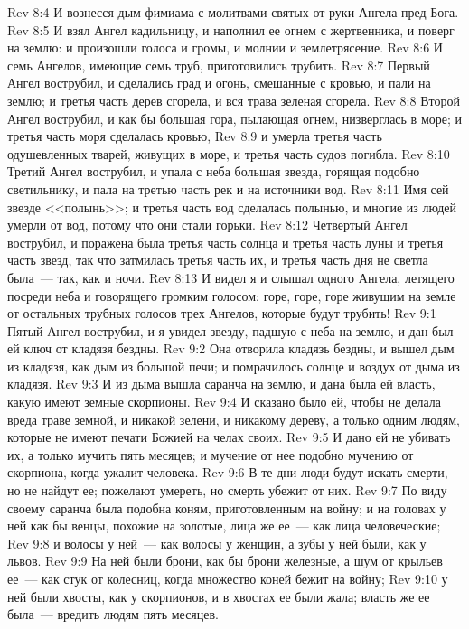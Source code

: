 \vs Rev 8:4 И вознесся дым фимиама с молитвами святых от руки Ангела пред Бога.
\vs Rev 8:5 И взял Ангел кадильницу, и наполнил ее огнем с жертвенника, и поверг на землю: и произошли голоса и громы, и молнии и землетрясение.
\rsbpar\vs Rev 8:6 И семь Ангелов, имеющие семь труб, приготовились трубить.
\rsbpar\vs Rev 8:7 Первый Ангел вострубил, и сделались град и огонь, смешанные с кровью, и пали на землю; и третья часть дерев сгорела, и вся трава зеленая сгорела.
\rsbpar\vs Rev 8:8 Второй Ангел вострубил, и как бы большая гора, пылающая огнем, низверглась в море; и третья часть моря сделалась кровью,
\vs Rev 8:9 и умерла третья часть одушевленных тварей, живущих в море, и третья часть судов погибла.
\rsbpar\vs Rev 8:10 Третий Ангел вострубил, и упала с неба большая звезда, горящая подобно светильнику, и пала на третью часть рек и на источники вод.
\vs Rev 8:11 Имя сей звезде <<полынь>>; и третья часть вод сделалась полынью, и многие из людей умерли от вод, потому что они стали горьки.
\rsbpar\vs Rev 8:12 Четвертый Ангел вострубил, и поражена была третья часть солнца и третья часть луны и третья часть звезд, так что затмилась третья часть их, и третья часть дня не светла была~--- так, как и ночи.
\vs Rev 8:13 И видел я и слышал одного Ангела, летящего посреди неба и говорящего громким голосом: горе, горе, горе живущим на земле от остальных трубных голосов трех Ангелов, которые будут трубить!
\vs Rev 9:1 Пятый Ангел вострубил, и я увидел звезду, падшую с неба на землю, и дан был ей ключ от кладязя бездны.
\vs Rev 9:2 Она отворила кладязь бездны, и вышел дым из кладязя, как дым из большой печи; и помрачилось солнце и воздух от дыма из кладязя.
\vs Rev 9:3 И из дыма вышла саранча на землю, и дана была ей власть, какую имеют земные скорпионы.
\vs Rev 9:4 И сказано было ей, чтобы не делала вреда траве земной, и никакой зелени, и никакому дереву, а только одним людям, которые не имеют печати Божией на челах своих.
\vs Rev 9:5 И дано ей не убивать их, а только мучить пять месяцев; и мучение от нее подобно мучению от скорпиона, когда ужалит человека.
\vs Rev 9:6 В те дни люди будут искать смерти, но не найдут ее; пожелают умереть, но смерть убежит от них.
\vs Rev 9:7 По виду своему саранча была подобна коням, приготовленным на войну; и на головах у ней как бы венцы, похожие на золотые, лица же ее~--- как лица человеческие;
\vs Rev 9:8 и волосы у ней~--- как волосы у женщин, а зубы у ней были, как у львов.
\vs Rev 9:9 На ней были брони, как бы брони железные, а шум от крыльев ее~--- как стук от колесниц, когда множество коней бежит на войну;
\vs Rev 9:10 у ней были хвосты, как у скорпионов, и в хвостах ее были жала; власть же ее была~--- вредить людям пять месяцев.
